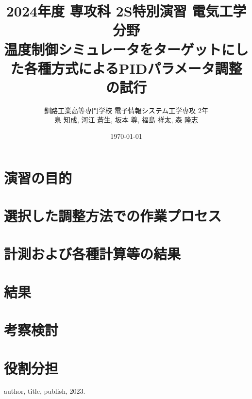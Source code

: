 \documentclass[a4j, titlepage]{jarticle}
\title{2024年度 専攻科 2S特別演習 電気工学分野\\温度制御シミュレータをターゲットにした各種方式によるPIDパラメータ調整の試行}
\author{釧路工業高等専門学校 電子情報システム工学専攻 2年\\泉 知成, 河江 蒼生, 坂本 尊, 福島 祥太, 森 隆志}
\date{\today}
\begin{document}
\maketitle
\tableofcontents
\clearpage
\section{演習の目的}
\section{選択した調整方法での作業プロセス}
\section{計測および各種計算等の結果}
\section{結果}
\section{考察検討}
\section{役割分担}

\begin{thebibliography}{9}
   author, title, publish, 2023.
\end{thebibliography}
\end{document}
